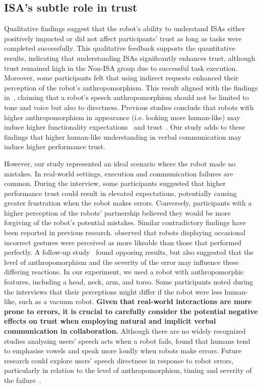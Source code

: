\subsection{ISA's subtle role in trust}
Qualitative findings suggest that the robot's ability to understand ISAs either positively impacted or did not affect participants' trust as long as tasks were completed successfully. This qualitative feedback supports the quantitative results, indicating that understanding ISAs significantly enhances trust, although trust remained high in the Non-ISA group due to successful task execution. Moreover, some participants felt that using indirect requests enhanced their perception of the robot’s anthropomorphism. This result aligned with the findings in~\cite{emnett2024using}, claiming that a robot's speech anthropomorphism should not be limited to tone and voice but also to directness. Previous studies conclude that robots with higher anthropomorphism in appearance (i.e. looking more human-like) may induce higher functionality expectations~\cite{duffy2003anthropomorphism} and trust~\cite{natarajan2020effects}. Our study adds to these findings that higher human-like understanding in verbal communication may induce higher performance trust. 

However, our study represented an ideal scenario where the robot made no mistakes. In real-world settings, execution and communication failures are common. During the interview, some participants suggested that higher performance trust could result in elevated expectations, potentially causing greater frustration when the robot makes errors. Conversely, participants with a higher perception of the robots' partnership believed they would be more forgiving of the robot’s potential mistakes. Similar contradictory findings have been reported in previous research. \citet{salem2013err} observed that robots displaying occasional incorrect gestures were perceived as more likeable than those that performed perfectly. A follow-up study~\cite{salem2015would} found opposing results, but also suggested that the level of anthropomorphism and the severity of the error may influence these differing reactions. In our experiment, we used a robot with anthropomorphic features, including a head, neck, arm, and torso. Some participants noted during the interviews that their perceptions might differ if the robot were less human-like, such as a vacuum robot. \textbf{Given that real-world interactions are more prone to errors, it is crucial to carefully consider the potential negative effects on trust when employing natural and implicit verbal communication in collaboration.} Although there are no widely recognized studies analysing users' speech acts when a robot fails, \citet{kontogiorgos2021systematic} found that humans tend to emphasise vowels and speak more loudly when robots make errors. Future research could explore users' speech directness in response to robot errors, particularly in relation to the level of anthropomorphism, timing and severity of the failure~\cite{rossi2017timing}.

